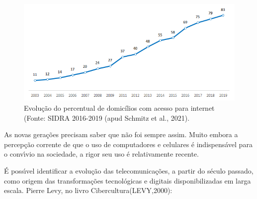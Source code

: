 \documentclass[
12pt,		%
openright,	%
twoside,  %
a4paper,			%
chapter=TITLE,		%
english,			%
french,				%
spanish,			%
brazil				%
]{USPSC-classe/USPSC}
\begin{document}
\captionsetup{format=plain}
\begin{figure}[max size={\textwidth}{\textheight}]

\centering


\begin{minipage}[b]{0.4\linewidth}
        \centering
                \includegraphics[width=1.0\linewidth]{../../imagens/acesso-internet.png}
                \caption{Evolu\c{c}\~ao do percentual de domic\'{i}lios com acesso para internet (Fonte: SIDRA 2016-2019  (apud Schmitz et al., 2021).}
                \label{dc69b8cf40fae2ba00158e43d2db2d294110957c}
\end{minipage}%
\hspace{0.5cm}
\end{figure}



As novas gera\c{c}\~oes precisam saber que n\~ao foi sempre assim. Muito embora a percep\c{c}\~ao corrente de que o uso de computadores e celulares \'e indispens\'avel para o conv\'{\i}vio na sociedade, a rigor seu uso \'e relativamente recente.

















\'E poss\'{\i}vel identificar a evolu\c{c}\~ao das telecomunica\c{c}\~oes, a partir do s\'eculo passado, como origem das transforma\c{c}\~oes tecnol\'ogicas e digitais disponibilizadas em larga escala. Pierre Levy, no livro \textquotedbl Cibercultura\textquotedbl (LEVY,2000):
\end{document}
